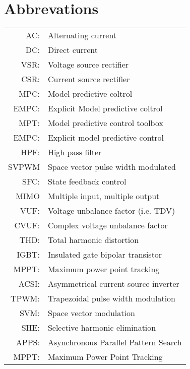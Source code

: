 \chapter*{Abbrevations}
\begin{longtable}{r l}
	AC:				& Alternating current\\
	DC:				& Direct current\\
  VSR:      & Voltage source rectifier \\
  CSR:      & Current source rectifier \\
  MPC:      & Model predictive coltrol\\
	EMPC:      & Explicit Model predictive coltrol\\
  MPT:      & Model predictive control toolbox\\
  EMPC:     & Explicit model predictive control\\
  HPF:      & High pass filter\\
  SVPWM     & Space vector pulse width modulated\\
  SFC:      & State feedback control\\
	MIMO			& Multiple input, multiple output\\
  VUF:      & Voltage unbalance factor (i.e. TDV)\\
	CVUF:			& Complex voltage unbalance factor\\
  THD:      & Total harmonic distortion\\
  IGBT:     & Insulated gate bipolar transistor\\
  MPPT:     & Maximum power point tracking\\
	ACSI:			& Asymmetrical current source inverter\\
	TPWM:			& Trapezoidal pulse width modulation\\
	SVM:			& Space vector modulation\\
	SHE:			& Selective harmonic elimination\\
	APPS:			& Asynchronous Parallel Pattern Search\\
	MPPT:			& Maximum Power Point Tracking\\

\end{longtable} 
